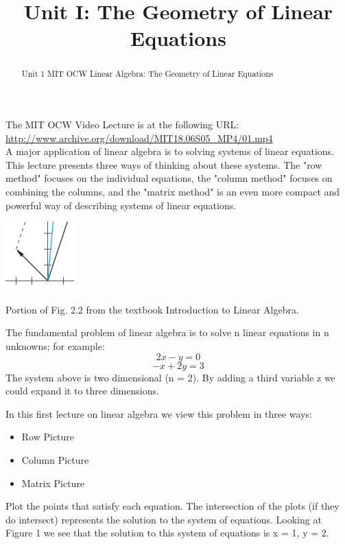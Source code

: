 \documentclass{ximera}
\title{Unit I: The Geometry of Linear Equations}
\begin{document}
\begin{abstract}
  Unit 1 MIT OCW Linear Algebra: The Geometry of Linear Equations
\end{abstract}\maketitle

\par

\noindent
The MIT OCW Video Lecture is at the following URL:\\
    \url{http://www.archive.org/download/MIT18.06S05_MP4/01.mp4}\\

\noindent
A major application of linear algebra is to solving systems of linear equations. This lecture presents three ways of thinking about these systems. The "row method" focuses on the individual equations, the "column method" focuses on combining the columns, and the "matrix method" is an even more compact and powerful way of describing systems of linear equations.

\par
\begin{center}
\includegraphics{1_1.jpg}

Portion of Fig. 2.2 from the textbook Introduction to Linear Algebra.
\end{center}


\noindent
The fundamental problem of linear algebra is to solve n linear equations in n unknowns; for example:
\[2x-y = 0\]
\[-x+2y = 3\]
The system above is two dimensional (n = 2). By adding a third variable z
we could expand it to three dimensions.

\noindent
In this first lecture on linear algebra we view this problem in three ways:

\begin{itemize}
\item Row Picture
\item Column Picture
\item Matrix Picture
\end{itemize}

\noindent
Plot the points that satisfy each equation. The intersection of the plots (if they do intersect) represents the solution to the system of equations. Looking at Figure 1 we see that the solution to this system of equations is x = 1, y = 2.
\end{document}
